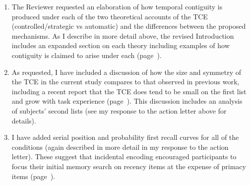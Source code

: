 \documentclass[12pt]{article}
\begin{document}
\begin{enumerate}

\item 
	The Reviewer requested an elaboration of how temporal contiguity is produced under each of the two theoretical accounts of the TCE (controlled/strategic vs automatic) and the differences between the proposed mechanisms. As I describe in more detail above, the revised Introduction includes an expanded section on each theory including examples of how contiguity is claimed to arise under each (page~\pageref{TODO-2}).

\item
	As requested, I have included a discussion of how the size and symmetry of the TCE in the current study compares to that observed in previous work, including a recent report that the TCE does tend to be small on the first list and grow with task experience (page~\pageref{TODO-5}). This discussion includes an analysis of subjects' second lists (see my response to the action letter above for details).
	
\item
	I have added serial position and probability first recall curves for all of the conditions (again described in more detail in my response to the action letter). These suggest that incidental encoding encouraged participants to focus their initial memory search on recency items at the expense of primacy items (page~\pageref{SPCtalk}).



\end{enumerate}
\end{document}

